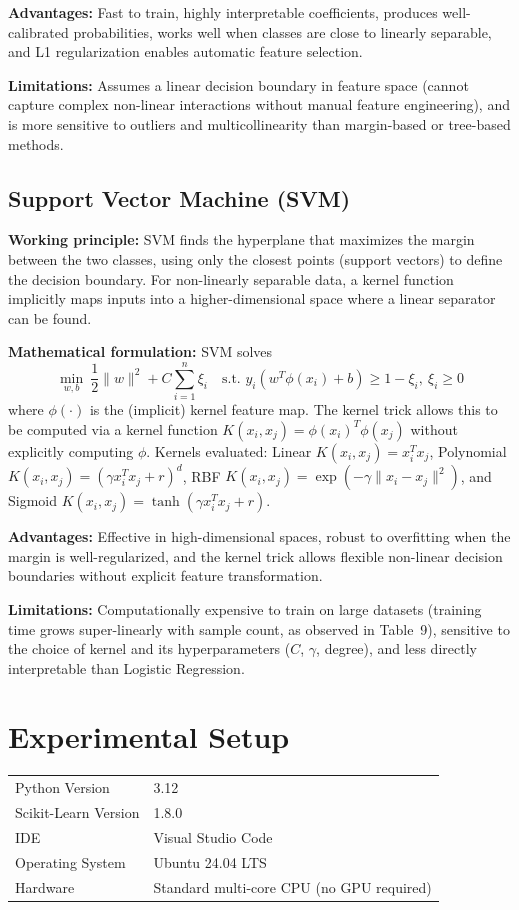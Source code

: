\documentclass[12pt,a4paper]{article}
\begin{document}
\textbf{Advantages:} Fast to train, highly interpretable coefficients, produces
well-calibrated probabilities, works well when classes are close to linearly
separable, and L1 regularization enables automatic feature selection.

\textbf{Limitations:} Assumes a linear decision boundary in feature space
(cannot capture complex non-linear interactions without manual feature
engineering), and is more sensitive to outliers and multicollinearity than
margin-based or tree-based methods.

\subsection*{Support Vector Machine (SVM)}
\textbf{Working principle:} SVM finds the hyperplane that maximizes the margin
between the two classes, using only the closest points (support vectors) to
define the decision boundary. For non-linearly separable data, a kernel
function implicitly maps inputs into a higher-dimensional space where a linear
separator can be found.

\textbf{Mathematical formulation:} SVM solves
\[
\min_{w,b}\ \frac{1}{2}\|w\|^2 + C\sum_{i=1}^n \xi_i \quad \text{s.t. } y_i(w^T\phi(x_i)+b)\geq 1-\xi_i,\ \xi_i\geq 0
\]
where $\phi(\cdot)$ is the (implicit) kernel feature map. The kernel trick
allows this to be computed via a kernel function $K(x_i,x_j)=\phi(x_i)^T\phi(x_j)$
without explicitly computing $\phi$. Kernels evaluated: Linear
$K(x_i,x_j)=x_i^Tx_j$, Polynomial $K(x_i,x_j)=(\gamma x_i^Tx_j + r)^d$, RBF
$K(x_i,x_j)=\exp(-\gamma\|x_i-x_j\|^2)$, and Sigmoid
$K(x_i,x_j)=\tanh(\gamma x_i^Tx_j + r)$.

\textbf{Advantages:} Effective in high-dimensional spaces, robust to
overfitting when the margin is well-regularized, and the kernel trick allows
flexible non-linear decision boundaries without explicit feature transformation.

\textbf{Limitations:} Computationally expensive to train on large datasets
(training time grows super-linearly with sample count, as observed in Table~9),
sensitive to the choice of kernel and its hyperparameters ($C$, $\gamma$,
degree), and less directly interpretable than Logistic Regression.

\section{Experimental Setup}
\begin{tabular}{ll}
\toprule
Python Version & 3.12 \\
Scikit-Learn Version & 1.8.0 \\
IDE & Visual Studio Code \\
Operating System & Ubuntu 24.04 LTS \\
Hardware & Standard multi-core CPU (no GPU required) \\
\bottomrule
\end{tabular}
\end{document}

